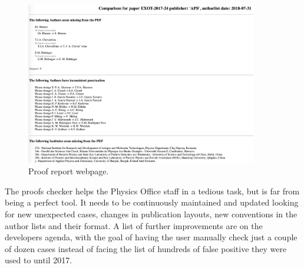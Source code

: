 \begin{figure}[htb]
  \centering
  \includegraphics[width=0.9\textwidth]{figures/proof_report_webpage.png}
  \caption{Proof report webpage.}
  \label{fig:proof_report_webpage}
\end{figure}

The proofs checker helps the Physics Office staff in a tedious task, but is far from being a perfect tool.
It needs to be continuously maintained and updated looking for new unexpected cases,
changes in publication layouts, new conventions in the author lists and their format.
A list of further improvements are on the developers agenda,
with the goal of having the user manually check just a couple of dozen cases instead of facing the list of hundreds of false positive they were used to until 2017.

